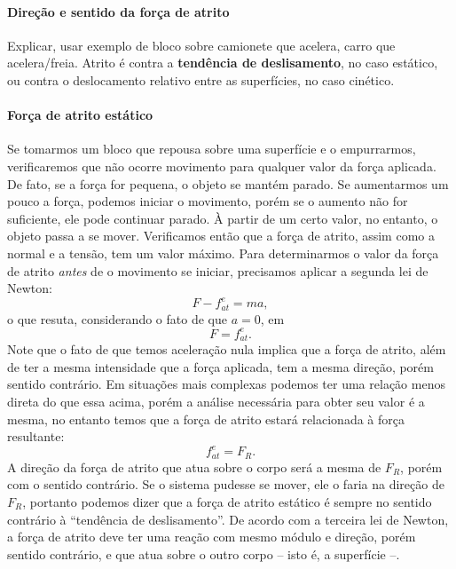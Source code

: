 \paragraph{Direção e sentido da força de atrito}

Explicar, usar exemplo de bloco sobre camionete que acelera, carro que acelera/freia. Atrito é contra a \textbf{tendência de deslisamento}, no caso estático, ou contra o deslocamento relativo entre as superfícies, no caso cinético.



\paragraph{Força de atrito estático} 

Se tomarmos um bloco que repousa sobre uma superfície e o empurrarmos, verificaremos que não ocorre movimento para qualquer valor da força aplicada. De fato, se a força for pequena, o objeto se mantém parado. Se aumentarmos um pouco a força, podemos iniciar o movimento, porém se o aumento não for suficiente, ele pode continuar parado. À partir de um certo valor, no entanto, o objeto passa a se mover. Verificamos então que a força de atrito, assim como a normal e a tensão, tem um valor máximo. Para determinarmos o valor da força de atrito \emph{antes} de o movimento se iniciar, precisamos aplicar a segunda lei de Newton:
\begin{equation}
  F - f_{at}^e = ma,
\end{equation}
%
o que resuta, considerando o fato de que $a = 0$, em
\begin{equation}
  F = f_{at}^e.
\end{equation}
%
Note que o fato de que temos aceleração nula implica que a força de atrito, além de ter a mesma intensidade que a força aplicada, tem a mesma direção, porém sentido contrário. Em situações mais complexas podemos ter uma relação menos direta do que essa acima, porém a análise necessária para obter seu valor é a mesma, no entanto temos que a força de atrito estará relacionada à força resultante:
\begin{equation}
  f_{at}^e = F_R.
\end{equation}
%
A direção da força de atrito que atua sobre o corpo será a mesma de $F_R$, porém com o sentido contrário. Se o sistema pudesse se mover, ele o faria na direção de $F_R$, portanto podemos dizer que a força de atrito estático é sempre no sentido contrário à ``tendência de deslisamento''. De acordo com a terceira lei de Newton, a força de atrito deve ter uma reação com mesmo módulo e direção, porém sentido contrário, e que atua sobre o outro corpo -- isto é, a superfície --.

